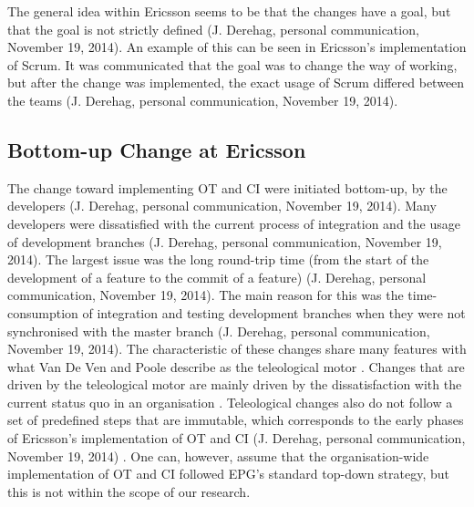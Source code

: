 \documentclass[final_report_innit.tex]{subfiles}
\begin{document}
The general idea within Ericsson seems to be that the changes have a goal, but that the goal is not strictly defined (J. Derehag, personal communication, November 19, 2014). An example of this can be seen in Ericsson’s implementation of Scrum. It was communicated that the goal was to change the way of working, but after the change was implemented, the exact usage of Scrum differed between the teams (J. Derehag, personal communication, November 19, 2014). 

\subsection{Bottom-up Change at Ericsson}
The change toward implementing OT and CI were initiated bottom-up, by the developers (J. Derehag, personal communication, November 19, 2014). Many developers were dissatisfied with the current process of integration and the usage of development branches (J. Derehag, personal communication, November 19, 2014). The largest issue was the long round-trip time (from the start of the development of a feature to the commit of a feature) (J. Derehag, personal communication, November 19, 2014). The main reason for this was the time-consumption of integration and testing development branches when they were not synchronised with the master branch (J. Derehag, personal communication, November 19, 2014). The characteristic of these changes share many features with what Van De Ven and Poole describe as the teleological motor \cite{van1995explaining}. Changes that are driven by the teleological motor are mainly driven by the dissatisfaction with the current status quo in an organisation \cite{van1995explaining}. Teleological changes also do not follow a set of predefined steps that are immutable, which corresponds to the early phases of Ericsson’s implementation of OT and CI (J. Derehag, personal communication, November 19, 2014) \cite{van1995explaining}. One can, however, assume that the organisation-wide implementation of OT and CI followed EPG’s standard top-down strategy, but this is not within the scope of our research.
\end{document}
